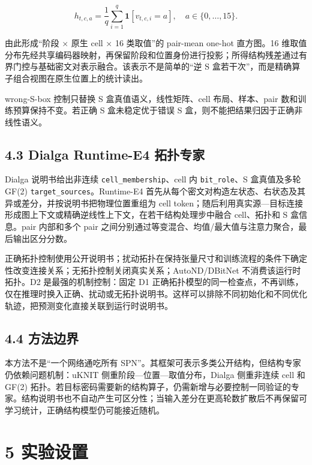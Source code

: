 \documentclass{templates/cjc-utf8}
\begin{document}
\[
h_{t,c,a}=\frac{1}{q}\sum_{i=1}^{q}\mathbf 1[v_{t,c,i}=a],
\quad a\in\{0,\ldots,15\}.
\]

由此形成``阶段 × 原生 cell × 16 类取值''的 pair-mean one-hot 直方图。16
维取值分布先经共享编码器映射，再保留阶段和位置身份进行投影；所得结构残差通过有界门控与基础密文对表示融合。该表示不是简单的``逆
S 盒若干次''，而是精确算子组合视图在原生位置上的统计读出。

wrong-S-box 控制只替换 S 盒真值语义，线性矩阵、cell 布局、样本、pair
数和训练预算保持不变。若正确 S 盒未稳定优于错误 S
盒，则不能把结果归因于正确非线性语义。

\hypertarget{dialga-runtime-e4-ux62d3ux6251ux4e13ux5bb6}{%
\subsection{4.3 Dialga Runtime-E4
拓扑专家}\label{dialga-runtime-e4-ux62d3ux6251ux4e13ux5bb6}}

Dialga 说明书给出非连续 \texttt{cell\_membership}、cell 内
\texttt{bit\_role}、S 盒真值及多轮 GF(2)
\texttt{target\_sources}。Runtime-E4
首先从每个密文对构造左状态、右状态及其异或差分，并按说明书把物理位置重组为
cell
token；随后利用真实源---目标连接形成图上下文或精确逆线性上下文，在若干结构处理步中融合
cell、拓扑和 S 盒信息。pair 内部和多个 pair
之间分别通过等变混合、均值/最大值与注意力聚合，最后输出区分分数。

正确拓扑控制使用公开说明书；扰动拓扑在保持张量尺寸和训练流程的条件下确定性改变连接关系；无拓扑控制关闭真实关系；AutoND/DBitNet
不消费该运行时拓扑。D2 是最强的机制控制：固定 D1
正确拓扑模型的同一检查点，不再训练，仅在推理时换入正确、扰动或无拓扑说明书。这样可以排除不同初始化和不同优化轨迹，把预测变化直接关联到运行时说明书。

\hypertarget{ux65b9ux6cd5ux8fb9ux754c}{%
\subsection{4.4 方法边界}\label{ux65b9ux6cd5ux8fb9ux754c}}

本方法不是``一个网络通吃所有
SPN''。其框架可表示多类公开结构，但结构专家仍依赖问题机制：uKNIT
侧重阶段---位置---取值分布，Dialga 侧重非连续 cell 和 GF(2)
拓扑。若目标密码需要新的结构算子，仍需新增与必要控制一同验证的专家。结构说明书也不自动产生可区分性；当输入差分在更高轮数扩散后不再保留可学习统计，正确结构模型仍可能接近随机。

\hypertarget{ux5b9eux9a8cux8bbeux7f6e}{%
\section{5 实验设置}\label{ux5b9eux9a8cux8bbeux7f6e}}
\end{document}
